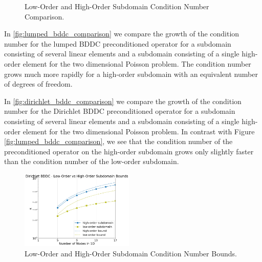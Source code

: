\documentclass[review]{siamart190516}
\begin{document}
\begin{figure}[!ht]
  \centering
  \hfill
  \caption{Low-Order and High-Order Subdomain Condition Number Comparison.}
\end{figure}

In \cref{fig:lumped_bddc_comparison} we compare the growth of the condition number for the lumped BDDC preconditioned operator for a subdomain consisting of several linear elements and a subdomain consisting of a single high-order element for the two dimensional Poisson problem.
The condition number grows much more rapidly for a high-order subdomain with an equivalent number of degrees of freedom.

In \cref{fig:dirichlet_bddc_comparison} we compare the growth of the condition number for the Dirichlet BDDC preconditioned operator for a subdomain consisting of several linear elements and a subdomain consisting of a single high-order element for the two dimensional Poisson problem.
In contrast with Figure \ref{fig:lumped_bddc_comparison}, we see that the condition number of the preconditioned operator on the high-order subdomain grows only slightly faster than the condition number of the low-order subdomain.

\begin{figure}[!ht]
  \centering\includegraphics[width=0.48\textwidth]{img/lowVsHighDirichletBounds}
  \caption{Low-Order and High-Order Subdomain Condition Number Bounds.}
  \label{fig:dirichlet_bddc_bounds}
\end{figure}
\end{document}
